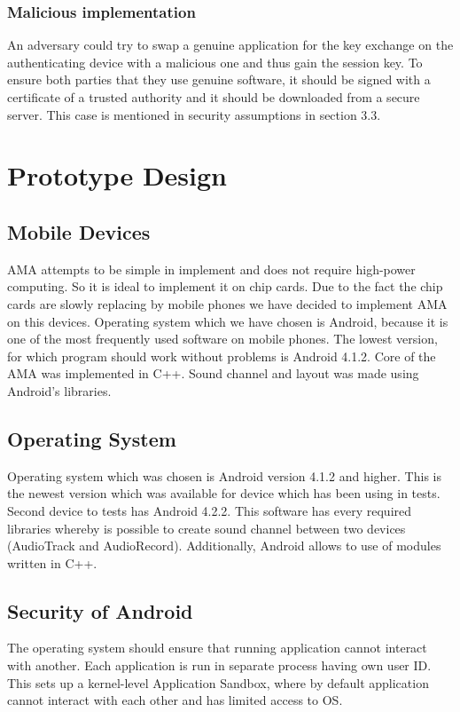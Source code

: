 \documentclass[11pt,titlepage]{article}
\theoremstyle{plain}
\begin{document}
\subsubsection{Malicious implementation}
An adversary could try to swap a genuine application for the key exchange on the authenticating device with a malicious one and thus gain the session key. To ensure both parties that they use genuine software, it should be signed with a certificate of a trusted authority and it should be downloaded from a secure server. This case is mentioned in security assumptions in section 3.3.



\section{Prototype Design}
\subsection{Mobile Devices}

AMA attempts to be simple in implement and does not require high-power computing. So it is ideal to implement it on chip cards. Due to the fact the chip cards are slowly replacing by mobile phones we have decided to implement AMA on this devices. Operating system which we have chosen is Android, because it is one of the most frequently used software on mobile phones. The lowest version, for which program should work without problems is Android 4.1.2. Core of the AMA was implemented in C++. Sound channel and layout was made using Android's libraries. 

\subsection{Operating System}

Operating system which was chosen is Android version 4.1.2 and higher. This is the newest version which was available for device which has been using in tests. Second device to tests has Android 4.2.2. This software has every required libraries whereby is possible to create sound channel between two devices (AudioTrack and AudioRecord). Additionally, Android allows to use of modules written in C++. 

\subsection{Security of Android}

The operating system should ensure that running application cannot interact with another. Each application is run in separate process having  own user ID. This sets up a kernel-level Application Sandbox, where by default application cannot interact with each other and has limited access to OS.
\end{document}
